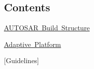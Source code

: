 \subsection*{Contents}


\begin{DoxyItemize}
\item \mbox{\hyperlink{asrbuild_root}{A\+U\+T\+O\+S\+AR Build Structure}}
\item \mbox{\hyperlink{adaptiveplatform_root}{Adaptive Platform}}
\item \mbox{[}Guidelines\mbox{]} 
\end{DoxyItemize}